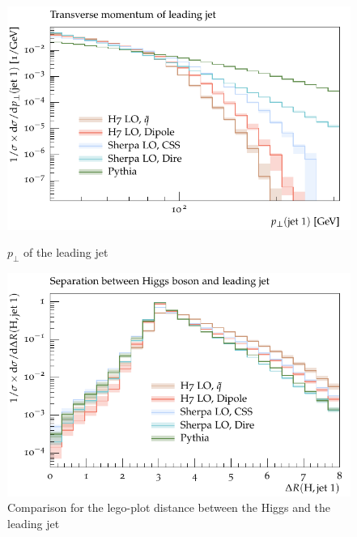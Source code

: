 \begin{figure}[h]
  \centering
  \begin{minipage}[t]{0.49\textwidth}
    \includegraphics[width=1\textwidth]{plots/H-125-MuShower/LH_H/jet1_pT.pdf}
    \caption{$p_\perp$ of the leading jet}
    \label{fig:h:jet1_pt}
  \end{minipage}
  \begin{minipage}[t]{0.49\textwidth}
    \includegraphics[width=1\textwidth]{plots/H-125-MuShower/LH_H/X_jet1_dR.pdf}
    \caption{Comparison for the lego-plot distance between the Higgs and the leading jet}
    \label{fig:h:deltaR}
  \end{minipage}
\end{figure}

